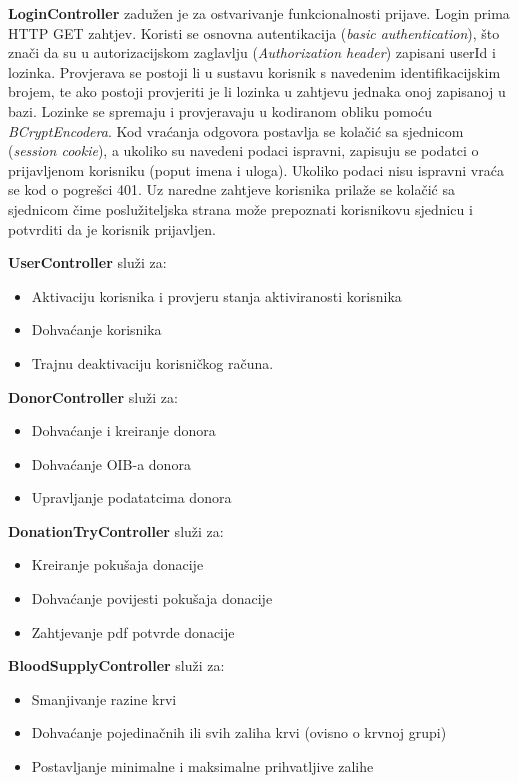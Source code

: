     \textbf{LoginController} zadužen je za ostvarivanje funkcionalnosti prijave. Login prima HTTP GET zahtjev. Koristi se osnovna autentikacija (\textit{basic authentication}), što znači da su u autorizacijskom zaglavlju (\textit{Authorization header}) zapisani userId i lozinka. Provjerava se postoji li u sustavu korisnik s navedenim identifikacijskim brojem, te ako postoji provjeriti je li lozinka u zahtjevu jednaka onoj zapisanoj u bazi. Lozinke se spremaju i provjeravaju u kodiranom obliku pomoću \textit{BCryptEncodera}. Kod vraćanja odgovora postavlja se kolačić sa sjednicom (\textit{session cookie}), a ukoliko su navedeni podaci ispravni, zapisuju se podatci o prijavljenom korisniku (poput imena i uloga). Ukoliko podaci nisu ispravni vraća se kod o pogrešci 401. Uz naredne zahtjeve korisnika prilaže se kolačić sa sjednicom čime poslužiteljska strana može prepoznati korisnikovu sjednicu i potvrditi da je korisnik prijavljen.
    
    \textbf{UserController} služi za: 
    \begin{itemize}
        \item Aktivaciju korisnika i provjeru stanja aktiviranosti korisnika
        \item Dohvaćanje korisnika
        \item Trajnu deaktivaciju korisničkog računa.
    \end{itemize}
    
    \textbf{DonorController} služi za: 
    \begin{itemize}
        \item Dohvaćanje i kreiranje donora 
        \item Dohvaćanje OIB-a donora
        \item Upravljanje podatatcima donora
    \end{itemize}
    
    \textbf{DonationTryController} služi za: 
    \begin{itemize}
        \item Kreiranje pokušaja donacije
        \item Dohvaćanje povijesti pokušaja donacije
        \item Zahtjevanje pdf potvrde donacije
    \end{itemize}
    
    \textbf{BloodSupplyController} služi za: 
    \begin{itemize}
        \item Smanjivanje razine krvi
        \item Dohvaćanje pojedinačnih ili svih zaliha krvi (ovisno o krvnoj grupi)
        \item Postavljanje minimalne i maksimalne prihvatljive zalihe
    \end{itemize}
    
